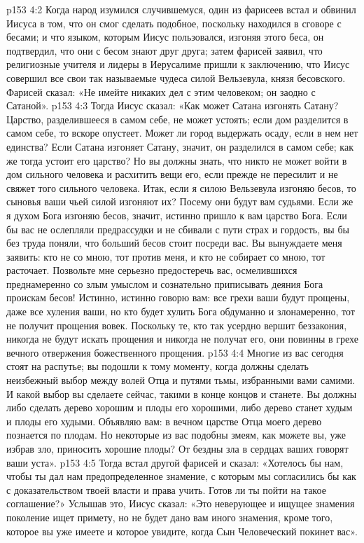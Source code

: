 \vs p153 4:2 Когда народ изумился случившемуся, один из фарисеев встал и обвинил Иисуса в том, что он смог сделать подобное, поскольку находился в сговоре с бесами; и что языком, которым Иисус пользовался, изгоняя этого беса, он подтвердил, что они с бесом знают друг друга; затем фарисей заявил, что религиозные учителя и лидеры в Иерусалиме пришли к заключению, что Иисус совершил все свои так называемые чудеса силой Вельзевула, князя бесовского. Фарисей сказал: «Не имейте никаких дел с этим человеком; он заодно с Сатаной».
\vs p153 4:3 Тогда Иисус сказал: «Как может Сатана изгонять Сатану? Царство, разделившееся в самом себе, не может устоять; если дом разделится в самом себе, то вскоре опустеет. Может ли город выдержать осаду, если в нем нет единства? Если Сатана изгоняет Сатану, значит, он разделился в самом себе; как же тогда устоит его царство? Но вы должны знать, что никто не может войти в дом сильного человека и расхитить вещи его, если прежде не пересилит и не свяжет того сильного человека. Итак, если я силою Вельзевула изгоняю бесов, то сыновья ваши чьей силой изгоняют их? Посему они будут вам судьями. Если же я духом Бога изгоняю бесов, значит, истинно пришло к вам царство Бога. Если бы вас не ослепляли предрассудки и не сбивали с пути страх и гордость, вы бы без труда поняли, что больший бесов стоит посреди вас. Вы вынуждаете меня заявить: кто не со мною, тот против меня, и кто не собирает со мною, тот расточает. Позвольте мне серьезно предостеречь вас, осмелившихся преднамеренно со злым умыслом и сознательно приписывать деяния Бога проискам бесов! Истинно, истинно говорю вам: все грехи ваши будут прощены, даже все хуления ваши, но кто будет хулить Бога обдуманно и злонамеренно, тот не получит прощения вовек. Поскольку те, кто так усердно вершит беззакония, никогда не будут искать прощения и никогда не получат его, они повинны в грехе вечного отвержения божественного прощения.
\vs p153 4:4 Многие из вас сегодня стоят на распутье; вы подошли к тому моменту, когда должны сделать неизбежный выбор между волей Отца и путями тьмы, избранными вами самими. И какой выбор вы сделаете сейчас, такими в конце концов и станете. Вы должны либо сделать дерево хорошим и плоды его хорошими, либо дерево станет худым и плоды его худыми. Объявляю вам: в вечном царстве Отца моего дерево познается по плодам. Но некоторые из вас подобны змеям, как можете вы, уже избрав зло, приносить хорошие плоды? От бездны зла в сердцах ваших говорят ваши уста».
\vs p153 4:5 Тогда встал другой фарисей и сказал: «Хотелось бы нам, чтобы ты дал нам предопределенное знамение, с которым мы согласились бы как с доказательством твоей власти и права учить. Готов ли ты пойти на такое соглашение?» Услышав это, Иисус сказал: «Это неверующее и ищущее знамения поколение ищет примету, но не будет дано вам иного знамения, кроме того, которое вы уже имеете и которое увидите, когда Сын Человеческий покинет вас».
